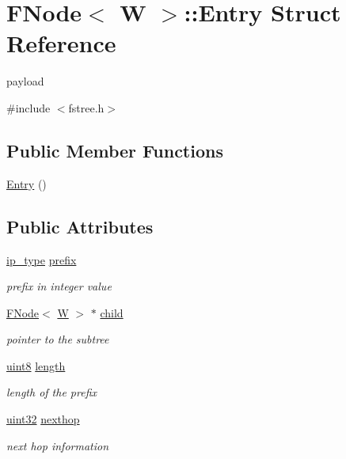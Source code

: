 \hypertarget{structFNode_1_1Entry}{\section{F\-Node$<$ W $>$\-:\-:Entry Struct Reference}
\label{structFNode_1_1Entry}
}


payload  




{\ttfamily \#include $<$fstree.\-h$>$}

\subsection*{Public Member Functions}
\begin{DoxyCompactItemize}
\item 
\hyperlink{structFNode_1_1Entry_a41c7f6fcab63db15ed5ad9a4e6af8051}{Entry} ()
\end{DoxyCompactItemize}
\subsection*{Public Attributes}
\begin{DoxyCompactItemize}
\item 
\hyperlink{structFNode_ae4ae2a97d6351584e0860a25b545cf94}{ip\-\_\-type} \hyperlink{structFNode_1_1Entry_a97738115c95a2dd37ab9857bd6764e6d}{prefix}
\begin{DoxyCompactList}\small\item\em prefix in integer value \end{DoxyCompactList}\item 
\hyperlink{structFNode}{F\-Node}$<$ \hyperlink{test__u128_8cpp_ab21b528bc38899d04d3a7053e52fb797}{W} $>$ $\ast$ \hyperlink{structFNode_1_1Entry_ac2c9531380ec322ed1cbe1a6b96c87e4}{child}
\begin{DoxyCompactList}\small\item\em pointer to the subtree \end{DoxyCompactList}\item 
\hyperlink{types_8h_a34ecedcf03a70dc91e4616212d79267d}{uint8} \hyperlink{structFNode_1_1Entry_a31122ff44d2ff23cea86adeebad30b1a}{length}
\begin{DoxyCompactList}\small\item\em length of the prefix \end{DoxyCompactList}\item 
\hyperlink{types_8h_abd01e8e67e3d94cab04ecaaf4f85ac1b}{uint32} \hyperlink{structFNode_1_1Entry_ae3e9eecef3c2171c60c8344d060ab491}{nexthop}
\begin{DoxyCompactList}\small\item\em next hop information \end{DoxyCompactList}\end{DoxyCompactItemize}


